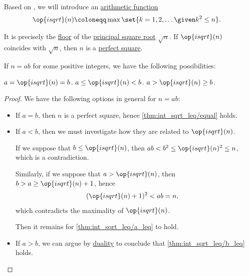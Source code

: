 \begin{definition}\label{def:int_sqrt}\mimprovised
  Based on \cite{PythonDocs:3.13:math}, we will introduce an  \hyperref[def:arithmetic_function]{arithmetic function}
  \begin{equation*}
    \op{isqrt}(n) \coloneqq \max\set{ k = 1, 2, \ldots \given k^2 \leq n }.
  \end{equation*}

\end{definition}
\begin{comments}
  \item It is precisely the \hyperref[def:real_floor_ceiling]{floor} of the \hyperref[def:principal_nonnegative_nth_root]{principal square root} \( \sqrt n \). If \( \op{isqrt}(n) \) coincides with \( \sqrt n \), then \( n \) is a \hyperref[def:semigroup_power]{perfect square}.
\end{comments}

\begin{proposition}\label{thm:int_sqrt_leq}
  If \( n = ab \) for some positive integers, we have the following possibilities:
  \begin{thmenum}
     \( a = \op{isqrt}(n) = b \).
     \( a \leq \op{isqrt}(n) < b \).
     \( a > \op{isqrt}(n) \geq b \).
  \end{thmenum}
\end{proposition}
\begin{proof}
  We have the following options in general for \( n = ab \):
  \begin{itemize}
    \item If \( a = b \), then \( n \) is a perfect square, hence \cref{thm:int_sqrt_leq/equal} holds.
    \item If \( a < b \), then we must investigate how they are related to \( \op{isqrt}(n) \).

    If we suppose that \( b \leq \op{isqrt}(n) \), then \( ab < b^2 \leq \op{isqrt}(n)^2 \leq n \), which is a contradiction.

    Similarly, if we suppose that \( a > \op{isqrt}(n) \), then \( b > a \geq \op{isqrt}(n) + 1 \), hence
    \begin{equation*}
      (\op{isqrt}(n) + 1)^2 < ab = n,
    \end{equation*}
    which contradicts the maximality of \( \op{isqrt}(n) \).

    Then it remains for \cref{thm:int_sqrt_leq/a_leq} to hold.

    \item If \( a > b \), we can argue by \hyperref[thm:order_duality]{duality} to conclude that \cref{thm:int_sqrt_leq/b_leq} holds.
  \end{itemize}
\end{proof}

